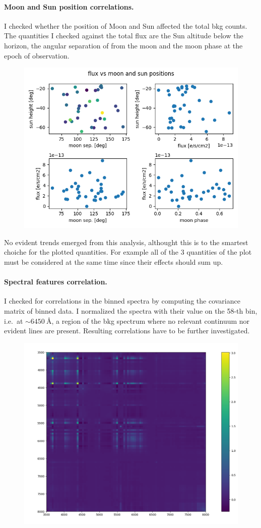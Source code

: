 \documentclass{article}
\begin{document}
\paragraph{Moon and Sun position correlations.}
I checked whether the position of Moon and Sun affected the total bkg counts. The quantities I checked against the total flux are the Sun altitude below the horizon, the angular separation of from the moon and the moon phase at the epoch of observation.
	\begin{figure}[h!]
	\centering
	\includegraphics[width=.75\textwidth]{../positions}
\end{figure}
No evident trends emerged from this analysis, althought this is to the smartest choiche for the plotted quantities. For example all of the 3 quantities of the plot must be considered at the same time since their effects should sum up.

\paragraph{Spectral features correlation.} I checked for correlations in the binned spectra by computing the covariance matrix of binned data. I normalized the spectra with their value on the 58-th bin, i.e.\ at $\sim\SI{6450}{\angstrom}$, a region of the bkg spectrum where no relevant continuum nor evident lines are present.  Resulting correlations have to be further investigated.
	\begin{figure}[h!]
	\centering
	\includegraphics[width=.75\textwidth]{../covariance}
\end{figure}
\end{document}
